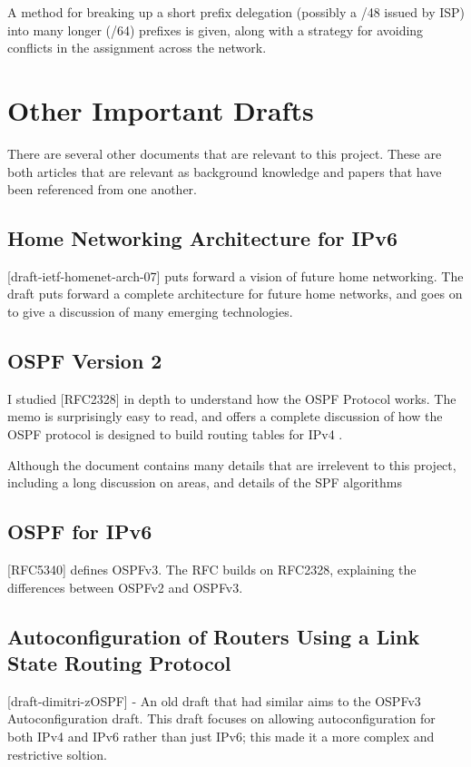 \documentclass[12pt]{report}
\begin{document}
A method for breaking up a short prefix delegation (possibly a /48 issued by
ISP) into many longer (/64) prefixes is given, along with a strategy for avoiding conflicts in the assignment
across the network.

\section{Other Important Drafts}
There are several other documents that are relevant to this project. These are
both articles that are relevant as background knowledge and papers that have
been referenced from one another.

\subsection{Home Networking Architecture for IPv6} 
[draft-ietf-homenet-arch-07] puts forward a vision of future home networking. The 
draft puts forward a complete architecture for future home networks, and goes on to 
give a discussion of many emerging technologies. 

\subsection{OSPF Version 2}
I studied [RFC2328] in depth to understand how the OSPF Protocol works. The 
memo is surprisingly easy to read, and offers a complete discussion of how the 
OSPF protocol is designed to build routing tables for IPv4 . 

Although the document contains many details that are irrelevent to this project, 
including a long discussion on areas, and details of the SPF algorithms

\subsection{OSPF for IPv6}
[RFC5340] defines OSPFv3. The RFC builds on RFC2328, explaining the differences between OSPFv2 and OSPFv3. 

\subsection{Autoconfiguration of Routers Using a Link State Routing Protocol}
[draft-dimitri-zOSPF] - An old draft that had similar aims to the OSPFv3 
Autoconfiguration draft. This draft focuses on allowing autoconfiguration for both 
IPv4 and IPv6 rather than just IPv6; this made it a more complex and restrictive 
soltion. 
\end{document}
